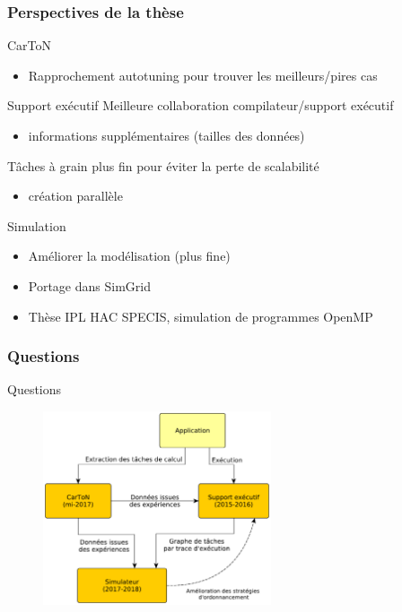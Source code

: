 \documentclass[xcolor={usenames,dvipsnames,svgnames,table}, aspectratio=43]{beamer}
\begin{document}
\begin{frame}
  \frametitle{Perspectives de la thèse}
  \begin{block}{CarToN}
    \begin{itemize}
      \item Rapprochement autotuning pour trouver les meilleurs/pires cas
    \end{itemize}
  \end{block}

  \begin{block}{Support exécutif}
    Meilleure collaboration compilateur/support exécutif
    \begin{itemize}
      \item informations supplémentaires (tailles des données)
    \end{itemize}
    Tâches à grain plus fin pour éviter la perte de scalabilité
    \begin{itemize}
      \item création parallèle
    \end{itemize}
  \end{block}

  \begin{block}{Simulation}
    \begin{itemize}
      \item Améliorer la modélisation (plus fine)
      \item Portage dans SimGrid
      \item Thèse IPL HAC SPECIS, simulation de programmes OpenMP
    \end{itemize}
  \end{block}
\end{frame}

\begin{frame}
  \frametitle{Questions}

  \centering Questions

  \begin{figure}
    \includegraphics[width=0.6\textwidth]{graph/big_picture-date.pdf}%
  \end{figure}
\end{frame}
\end{document}
